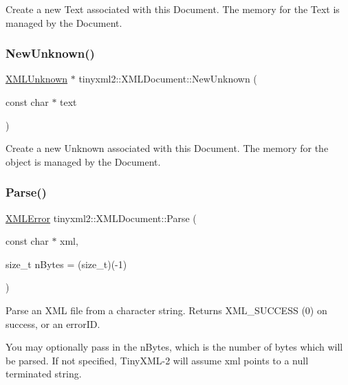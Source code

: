 Create a new Text associated with this Document. The memory for the Text is managed by the Document. \mbox{\label{classtinyxml2_1_1_x_m_l_document_a4954f502c5fd7f49de54c3c0c99bb73d}} 
\subsubsection{\texorpdfstring{New\+Unknown()}{NewUnknown()}}
{\footnotesize\ttfamily \mbox{\hyperlink{classtinyxml2_1_1_x_m_l_unknown}{X\+M\+L\+Unknown}} $\ast$ tinyxml2\+::\+X\+M\+L\+Document\+::\+New\+Unknown (\begin{DoxyParamCaption}\item[{const char $\ast$}]{text }\end{DoxyParamCaption})}

Create a new Unknown associated with this Document. The memory for the object is managed by the Document. \mbox{\label{classtinyxml2_1_1_x_m_l_document_a1819bd34f540a7304c105a6232d25a1f}} 
\subsubsection{\texorpdfstring{Parse()}{Parse()}}
{\footnotesize\ttfamily \mbox{\hyperlink{namespacetinyxml2_a1fbf88509c3ac88c09117b1947414e08}{X\+M\+L\+Error}} tinyxml2\+::\+X\+M\+L\+Document\+::\+Parse (\begin{DoxyParamCaption}\item[{const char $\ast$}]{xml,  }\item[{size\+\_\+t}]{n\+Bytes = {\ttfamily (size\+\_\+t)(-\/1)} }\end{DoxyParamCaption})}

Parse an X\+ML file from a character string. Returns X\+M\+L\+\_\+\+S\+U\+C\+C\+E\+SS (0) on success, or an error\+ID.

You may optionally pass in the \textquotesingle{}n\+Bytes\textquotesingle{}, which is the number of bytes which will be parsed. If not specified, Tiny\+X\+M\+L-\/2 will assume \textquotesingle{}xml\textquotesingle{} points to a null terminated string. \mbox{\label{classtinyxml2_1_1_x_m_l_document_a867cf5fa3e3ff6ae4847a8b7ee8ec083}} 
